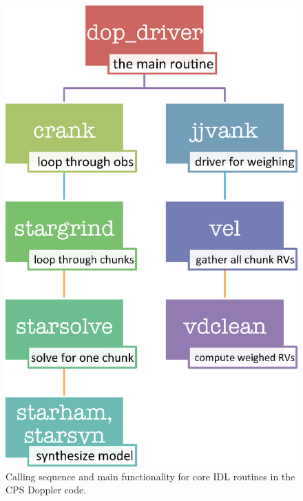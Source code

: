 \begin{figure}
  \centering
\includegraphics[scale=0.6]{doppler/flowchart.eps}
\caption{Calling sequence and main functionality for core IDL
  routines in the CPS Doppler code. \label{doppler:fig:flowchart}}
\end{figure}


